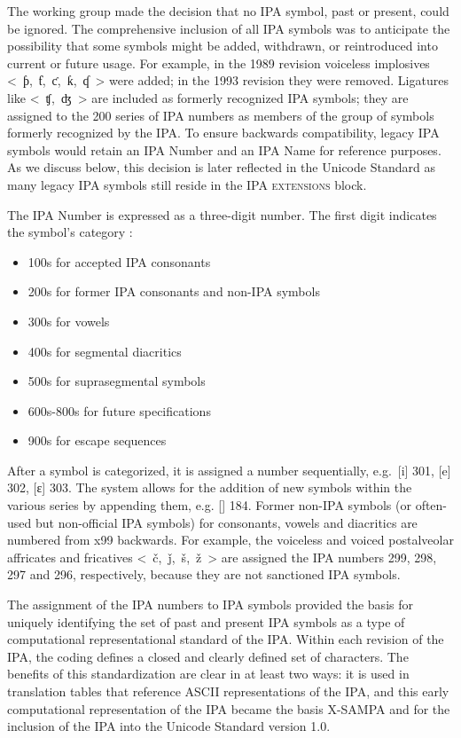 The working group made the decision that no IPA symbol, past or present, 
could be ignored. The comprehensive inclusion of all IPA symbols was to 
anticipate the possibility that some symbols might be added, withdrawn, 
or reintroduced into current or future usage. For example, in the 1989 
revision voiceless implosives <~ƥ,~ƭ,~ƈ,~ƙ,~ʠ~> were added; in the 1993 
revision they were removed. Ligatures like <~ʧ,~ʤ~> are included as formerly 
recognized IPA symbols; they are assigned to the 200 series of IPA numbers 
as members of the group of symbols formerly recognized by the IPA. To ensure 
backwards compatibility, legacy IPA symbols would retain an IPA Number and 
an IPA Name for reference purposes. As we discuss below, this decision is 
later reflected in the Unicode Standard as many legacy IPA symbols still reside in 
the \textsc{IPA extensions} block.

The IPA Number is expressed as a three-digit number. The first digit 
indicates the symbol's category \citep{Esling1990,EslingGaylord1993}:

\begin{itemize}
	\item 100s for accepted IPA consonants
	\item 200s for former IPA consonants and non-IPA symbols
	\item 300s for vowels
	\item 400s for segmental diacritics
	\item 500s for suprasegmental symbols
	\item 600s-800s for future specifications
	\item 900s for escape sequences
\end{itemize}

After a symbol is categorized, it is assigned a number sequentially, e.g.\ [i]
301, [e] 302, [ɛ] 303. The system allows for the addition of new symbols within
the various series by appending them, e.g. [] 184. Former non-IPA
symbols (or often-used but non-official IPA symbols) for consonants, vowels and
diacritics are numbered from x99 backwards. For example, the voiceless and
voiced postalveolar affricates and fricatives <~č,~ǰ,~š,~ž~> are assigned the
IPA numbers 299, 298, 297 and 296, respectively, because they are not sanctioned
IPA symbols.

The assignment of the IPA numbers to IPA symbols provided the basis for uniquely
identifying the set of past and present IPA symbols as a type of computational
representational standard of the IPA. Within each revision of the IPA, the
coding defines a closed and clearly defined set of characters. The benefits of
this standardization are clear in at least two ways: it is used in translation
tables that reference ASCII representations of the IPA, and this early
computational representation of the IPA became the basis X-SAMPA and for the
inclusion of the IPA into the Unicode Standard version 1.0.

